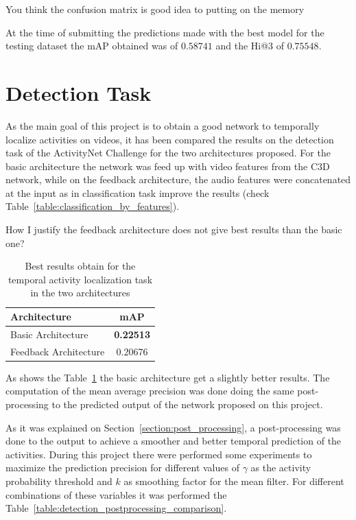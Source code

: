 You think the confusion matrix is good idea to putting on the memory

At the time of submitting the predictions made with the best model for the testing dataset the mAP obtained was of $0.58741$ and the Hi@3 of $0.75548$.

\section{Detection Task}

As the main goal of this project is to obtain a good network to temporally localize activities on videos, it has been compared the results on the detection task of the ActivityNet Challenge for the two architectures proposed. For the basic architecture the network was feed up with video features from the C3D network, while on the feedback architecture, the audio features were concatenated at the input as in classification task improve the results (check Table~\ref{table:classification_by_features}).

How I justify the feedback architecture does not give best results than the basic one?

\begin{table}[H]
\begin{center}
\begin{tabular}{|l|c|}
\hline
Architecture & mAP \\
\hline\hline
Basic Architecture & \bf0.22513 \\
Feedback Architecture & 0.20676 \\
\hline
\end{tabular}
\end{center}
\caption{Best results obtain for the temporal activity localization task in the two architectures}
\label{table:detection_architecture_comparison}
\end{table}

As shows the Table~\ref{table:detection_architecture_comparison} the basic architecture get a slightly better results. The computation of the mean average precision was done doing the same post-processing to the predicted output of the network proposed on this project.

As it was explained on Section~\ref{section:post_processing}, a post-processing was done to the output to achieve a smoother and better temporal prediction of the activities. During this project there were performed some experiments to maximize the prediction precision for different values of $\gamma$ as the activity probability threshold and $k$ as smoothing factor for the mean filter. For different combinations of these variables it was performed the Table~\ref{table:detection_postprocessing_comparison}.

